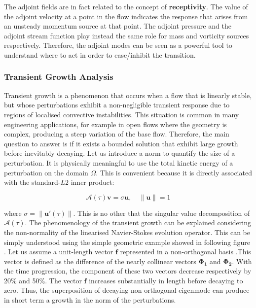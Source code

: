 The adjoint fields are in fact related to the concept of \textbf{receptivity}. The value of the adjoint velocity at a point in the flow indicates the response that arises from an unsteady momentum source at that point. The adjoint pressure and the adjoint stream function play instead the same role for mass and vorticity sources respectively. Therefore, the adjoint modes can be seen as a powerful tool to understand where to act in order to ease/inhibit the transition.

\subsubsection{Transient Growth Analysis}

Transient growth  is a phenomenon that occurs when a flow that is linearly stable, but whose perturbations exhibit a non-negligible transient response due to regions of localised convective instabilities. This situation is common in many engineering applications, for example in open flows where the geometry is complex, producing a steep variation of the base flow. Therefore, the main question to answer is if it exists a bounded solution that exhibit large growth before inevitably decaying. Let us introduce a norm to quantify the size of a perturbation. It is physically meaningful to use the total kinetic energy of a perturbation on the domain $\Omega$. This is convenient because it is directly associated with the
standard-$L2$ inner product: 

\begin{equation}
\mathcal{A}(\tau)\mathbf{v}=\sigma \mathbf{u}, \quad \left\| \mathbf{u} \right\|=1
\end{equation}


where $\sigma=\left\| \mathbf{u'}(\tau)\right\|$. This is no other that the singular value decomposition of $\mathcal{A}(\tau)$. The phenomenology of the transient growth can be explained considering the non-normality of the linearised Navier-Stokes evolution operator. This can be simply understood using the simple geometric example showed in following figure . Let us assume a unit-length vector $\mathbf{f}$ represented in a non-orthogonal basis .This vector is defined as the difference of the nearly collinear vectors $\mathbf{\Phi_1}$ and $\mathbf{\Phi_2}$.  With the time progression, the component of these two vectors decrease respectively by 20\% and 50\%. The vector $\mathbf{f}$ increases substantially in length before decaying to zero. Thus, the superposition of decaying non-orthogonal eigenmode can produce in short term a growth in the norm of the perturbations. 


